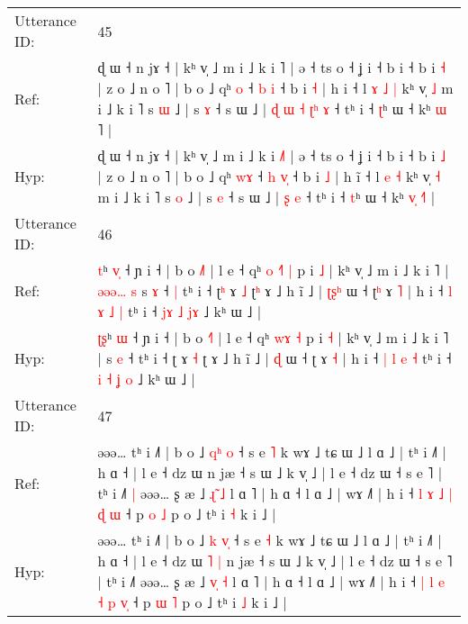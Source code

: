 \documentclass[10pt]{article}
\DeclareRobustCommand{\hl}[1]{{\textcolor{red}{#1}}}
\begin{document}
\begin{longtable}{ll}
 \\
\midrule
Utterance ID: & 45 \\
Ref: & ɖ ɯ ˧ n jɤ ˧ | kʰ v̩ ˩ m i ˩ k i \hl{}˥ | ə ˧ ts o ˧ ʝ i ˧ b i ˧ b i \hl{˧} | z o ˩ n o ˥ | b o ˩ qʰ \hl{}\hl{o} ˧ \hl{b} \hl{}\hl{i} ˧ b i \hl{˧} | h i\hl{} ˧ l\hl{ }\hl{ɤ} \hl{˩} \hl{|} kʰ v̩ \hl{˩} m i ˩ k i ˥ s \hl{ɯ} ˩ | s \hl{ɤ} ˧ s ɯ ˩ |\hl{ }\hl{ɖ}\hl{ }\hl{ɯ}\hl{ }\hl{˧} \hl{ʈ}\hl{ʰ} \hl{ɤ} ˧ tʰ i ˧ \hl{ʈ}ʰ ɯ ˧ kʰ \hl{}\hl{ɯ} \hl{}˥ |
 \\
Hyp: & ɖ ɯ ˧ n jɤ ˧ | kʰ v̩ ˩ m i ˩ k i \hl{˩}˥ | ə ˧ ts o ˧ ʝ i ˧ b i ˧ b i \hl{˩} | z o ˩ n o ˥ | b o ˩ qʰ \hl{w}\hl{ɤ} ˧ \hl{h} \hl{v}\hl{̩} ˧ b i \hl{˩} | h i\hl{̃} ˧ l\hl{}\hl{} \hl{e} \hl{˧} kʰ v̩ \hl{˧} m i ˩ k i ˥ s \hl{o} ˩ | s \hl{e} ˧ s ɯ ˩ |\hl{}\hl{}\hl{}\hl{}\hl{}\hl{} \hl{}\hl{ʂ} \hl{e} ˧ tʰ i ˧ \hl{t}ʰ ɯ ˧ kʰ \hl{v}\hl{̩} \hl{˧}˥ |
 \\
\midrule
Utterance ID: & 46 \\
Ref: & \hl{}\hl{t}ʰ \hl{v}\hl{̩} ˧ ɲ i ˧ | b o \hl{˩}˥ | l e ˧ qʰ\hl{ }\hl{o} \hl{˧}\hl{˥} \hl{|} p i \hl{˩} | kʰ v̩ ˩ m i ˩ k i ˥ |\hl{ }\hl{ə}\hl{ə}\hl{ə}\hl{…}\hl{ }\hl{s} s \hl{ɤ} ˧\hl{ }\hl{|} tʰ i ˧ ʈ\hl{ʰ} ɤ \hl{˩} ʈ\hl{ʰ} ɤ ˩ h ĩ ˩ | \hl{ʈ}\hl{ʂ}\hl{ʰ} ɯ ˧ ʈ\hl{ʰ} ɤ \hl{˥} | h i ˧ \hl{l} \hl{ɤ} \hl{˩} \hl{|} tʰ i ˧ \hl{j}\hl{ɤ} \hl{˩} \hl{}\hl{j}\hl{ɤ} ˩ kʰ ɯ ˩ |
 \\
Hyp: & \hl{ʈ}\hl{ʂ}ʰ \hl{}\hl{ɯ} ˧ ɲ i ˧ | b o \hl{˧}˥ | l e ˧ qʰ\hl{}\hl{} \hl{w}\hl{ɤ} \hl{˧} p i \hl{˧} | kʰ v̩ ˩ m i ˩ k i ˥ |\hl{}\hl{}\hl{}\hl{}\hl{}\hl{}\hl{} s \hl{e} ˧\hl{}\hl{} tʰ i ˧ ʈ\hl{} ɤ \hl{˧} ʈ\hl{} ɤ ˩ h ĩ ˩ | \hl{}\hl{}\hl{ɖ} ɯ ˧ ʈ\hl{} ɤ \hl{˧} | h i ˧ \hl{|} \hl{l} \hl{e} \hl{˧} tʰ i ˧ \hl{}\hl{i} \hl{˧} \hl{ʝ}\hl{ }\hl{o} ˩ kʰ ɯ ˩ |
 \\
\midrule
Utterance ID: & 47 \\
Ref: & əəə… tʰ i ˩˥ | b o ˩ \hl{q}\hl{ʰ}\hl{ }\hl{o} ˧ s e \hl{˥} k wɤ ˩ tɕ ɯ ˩ l ɑ ˩ | tʰ i ˩˥ | h ɑ ˧ | l e ˧ dz ɯ\hl{}\hl{}\hl{}\hl{} n jæ ˧ s ɯ ˩ k v̩ ˩ | l e ˧ dz ɯ ˧ s e ˥ | tʰ i ˩˥\hl{ }\hl{|} əəə… ʂ æ ˩ \hl{ɻ}\hl{̃} \hl{˩} l ɑ ˥ | h ɑ ˧ l ɑ ˩ | wɤ ˩˥ | h i ˧ \hl{l} \hl{ɤ} \hl{˩} \hl{|} \hl{ɖ} \hl{}\hl{ɯ} ˧ p \hl{o} \hl{˩} p o ˩ tʰ i \hl{˧} k i ˩ |
 \\
Hyp: & əəə… tʰ i ˩˥ | b o ˩ \hl{k}\hl{ }\hl{v}\hl{̩} ˧ s e \hl{˧} k wɤ ˩ tɕ ɯ ˩ l ɑ ˩ | tʰ i ˩˥ | h ɑ ˧ | l e ˧ dz ɯ\hl{ }\hl{˥}\hl{ }\hl{|} n jæ ˧ s ɯ ˩ k v̩ ˩ | l e ˧ dz ɯ ˧ s e ˥ | tʰ i ˩˥\hl{}\hl{} əəə… ʂ æ ˩ \hl{v}\hl{̩} \hl{˧} l ɑ ˥ | h ɑ ˧ l ɑ ˩ | wɤ ˩˥ | h i ˧ \hl{|} \hl{l} \hl{e} \hl{˧} \hl{p} \hl{v}\hl{̩} ˧ p \hl{ɯ} \hl{˥} p o ˩ tʰ i \hl{˩} k i ˩ |

\end{longtable}
\end{document}
